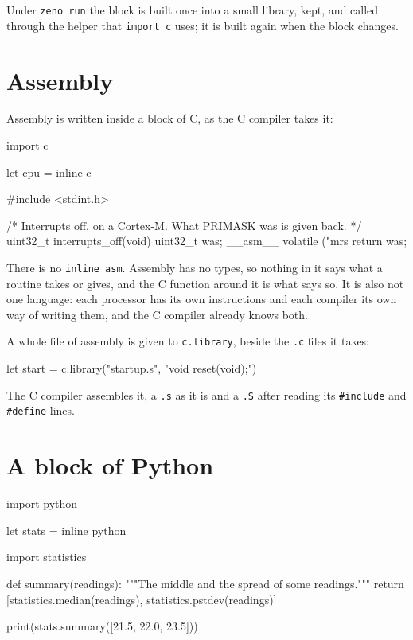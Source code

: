 Under \verb|zeno run| the block is built once into a small library,
kept, and called through the helper that \verb|import c| uses; it is
built again when the block changes.

\section{Assembly}

Assembly is written inside a block of C, as the C compiler takes it:

\begin{zenofrag}[parse=no]
import c

let cpu = inline c {
    #include <stdint.h>

    /* Interrupts off, on a Cortex-M. What PRIMASK was is given back. */
    uint32_t interrupts_off(void) {
        uint32_t was;
        __asm__ volatile ("mrs %
        return was;
    }
}
\end{zenofrag}

There is no \verb|inline asm|. Assembly has no types, so nothing in it
says what a routine takes or gives, and the C function around it is
what says so. It is also not one language: each processor has its own
instructions and each compiler its own way of writing them, and the C
compiler already knows both.

A whole file of assembly is given to \verb|c.library|, beside the
\verb|.c| files it takes:

\begin{zenofrag}
let start = c.library("startup.s", "void reset(void);")
\end{zenofrag}

The C compiler assembles it, a \verb|.s| as it is and a \verb|.S|
after reading its \verb|#include| and \verb|#define| lines.

\section{A block of Python}

\begin{zeno}[file=stats.zeno, dir=blocks]
import python

let stats = inline python {
    import statistics

    def summary(readings):
        """The middle and the spread of some readings."""
        return [statistics.median(readings), statistics.pstdev(readings)]
}

print(stats.summary([21.5, 22.0, 23.5]))
\end{zeno}

